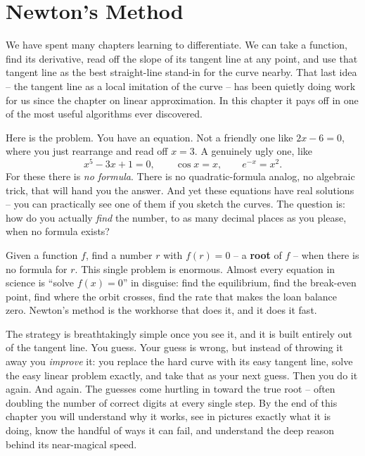 \chapter{Newton's Method}

We have spent many chapters learning to differentiate. We can take a function,
find its derivative, read off the slope of its tangent line at any point, and use
that tangent line as the best straight-line stand-in for the curve nearby. That
last idea -- the tangent line as a local imitation of the curve -- has been quietly
doing work for us since the chapter on linear approximation. In this chapter it
pays off in one of the most useful algorithms ever discovered.

Here is the problem. You have an equation. Not a friendly one like $2x - 6 = 0$,
where you just rearrange and read off $x = 3$. A genuinely ugly one, like
\[
  x^5 - 3x + 1 = 0, \qquad \cos x = x, \qquad e^{-x} = x^2.
\]
For these there is \emph{no formula}. There is no quadratic-formula analog, no
algebraic trick, that will hand you the answer. And yet these equations have real
solutions -- you can practically see one of them if you sketch the curves. The
question is: how do you actually \emph{find} the number, to as many decimal places
as you please, when no formula exists?

\begin{focusbox}
Given a function $f$, find a number $r$ with $f(r) = 0$ -- a \textbf{root} of $f$ --
when there is no formula for $r$. This single problem is enormous. Almost every
equation in science is ``solve $f(x) = 0$'' in disguise: find the equilibrium, find
the break-even point, find where the orbit crosses, find the rate that makes the
loan balance zero. Newton's method is the workhorse that does it, and it does it
fast.
\end{focusbox}

The strategy is breathtakingly simple once you see it, and it is built entirely
out of the tangent line. You guess. Your guess is wrong, but instead of throwing
it away you \emph{improve} it: you replace the hard curve with its easy tangent
line, solve the easy linear problem exactly, and take that as your next guess. Then
you do it again. And again. The guesses come hurtling in toward the true root --
often doubling the number of correct digits at every single step. By the end of
this chapter you will understand why it works, see in pictures exactly what it is
doing, know the handful of ways it can fail, and understand the deep reason behind
its near-magical speed.

